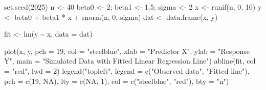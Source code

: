 \documentclass[
  letterpaper,
]{scrbook}
\newenvironment{Shaded}{\begin{snugshade}}{\end{snugshade}}
\newcommand{\AttributeTok}[1]{\textcolor[rgb]{0.40,0.45,0.13}{#1}}
\newcommand{\ConstantTok}[1]{\textcolor[rgb]{0.56,0.35,0.01}{#1}}
\newcommand{\DecValTok}[1]{\textcolor[rgb]{0.68,0.00,0.00}{#1}}
\newcommand{\FloatTok}[1]{\textcolor[rgb]{0.68,0.00,0.00}{#1}}
\newcommand{\FunctionTok}[1]{\textcolor[rgb]{0.28,0.35,0.67}{#1}}
\newcommand{\NormalTok}[1]{\textcolor[rgb]{0.00,0.23,0.31}{#1}}
\newcommand{\OtherTok}[1]{\textcolor[rgb]{0.00,0.23,0.31}{#1}}
\newcommand{\SpecialCharTok}[1]{\textcolor[rgb]{0.37,0.37,0.37}{#1}}
\newcommand{\StringTok}[1]{\textcolor[rgb]{0.13,0.47,0.30}{#1}}
\begin{document}
\begin{Shaded}
\begin{Highlighting}[]
\FunctionTok{set.seed}\NormalTok{(}\DecValTok{2025}\NormalTok{)}
\NormalTok{n }\OtherTok{\textless{}{-}} \DecValTok{40}
\NormalTok{beta0 }\OtherTok{\textless{}{-}} \DecValTok{2}\NormalTok{; beta1 }\OtherTok{\textless{}{-}} \FloatTok{1.5}\NormalTok{; sigma }\OtherTok{\textless{}{-}} \DecValTok{2}
\NormalTok{x }\OtherTok{\textless{}{-}} \FunctionTok{runif}\NormalTok{(n, }\DecValTok{0}\NormalTok{, }\DecValTok{10}\NormalTok{)}
\NormalTok{y }\OtherTok{\textless{}{-}}\NormalTok{ beta0 }\SpecialCharTok{+}\NormalTok{ beta1 }\SpecialCharTok{*}\NormalTok{ x }\SpecialCharTok{+} \FunctionTok{rnorm}\NormalTok{(n, }\DecValTok{0}\NormalTok{, sigma)}
\NormalTok{dat }\OtherTok{\textless{}{-}} \FunctionTok{data.frame}\NormalTok{(x, y)}

\NormalTok{fit }\OtherTok{\textless{}{-}} \FunctionTok{lm}\NormalTok{(y }\SpecialCharTok{\textasciitilde{}}\NormalTok{ x, }\AttributeTok{data =}\NormalTok{ dat)}

\FunctionTok{plot}\NormalTok{(x, y, }\AttributeTok{pch =} \DecValTok{19}\NormalTok{, }\AttributeTok{col =} \StringTok{"steelblue"}\NormalTok{,}
     \AttributeTok{xlab =} \StringTok{"Predictor X"}\NormalTok{, }\AttributeTok{ylab =} \StringTok{"Response Y"}\NormalTok{,}
     \AttributeTok{main =} \StringTok{"Simulated Data with Fitted Linear Regression Line"}\NormalTok{)}
\FunctionTok{abline}\NormalTok{(fit, }\AttributeTok{col =} \StringTok{"red"}\NormalTok{, }\AttributeTok{lwd =} \DecValTok{2}\NormalTok{)}
\FunctionTok{legend}\NormalTok{(}\StringTok{"topleft"}\NormalTok{, }\AttributeTok{legend =} \FunctionTok{c}\NormalTok{(}\StringTok{"Observed data"}\NormalTok{, }\StringTok{"Fitted line"}\NormalTok{),}
       \AttributeTok{pch =} \FunctionTok{c}\NormalTok{(}\DecValTok{19}\NormalTok{, }\ConstantTok{NA}\NormalTok{), }\AttributeTok{lty =} \FunctionTok{c}\NormalTok{(}\ConstantTok{NA}\NormalTok{, }\DecValTok{1}\NormalTok{), }\AttributeTok{col =} \FunctionTok{c}\NormalTok{(}\StringTok{"steelblue"}\NormalTok{, }\StringTok{"red"}\NormalTok{), }\AttributeTok{bty =} \StringTok{"n"}\NormalTok{)}
\end{Highlighting}
\end{Shaded}
\end{document}
